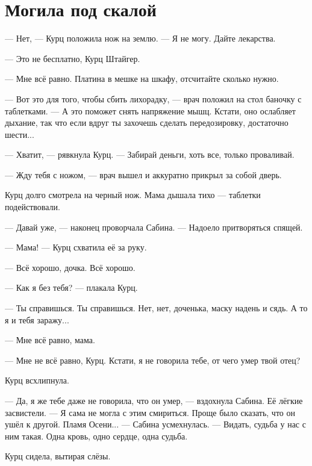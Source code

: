 \documentclass[a4paper,12pt,fleqn]{book}\usepackage{polyglossia}\setdefaultlanguage[babelshorthands=true]{russian}\setotherlanguage{english}\defaultfontfeatures{Ligatures=TeX,Mapping=tex-text}\usepackage{xcolor}\newcommand{\ml}[3]{#2}
\begin{document}
\section{Могила под скалой}

--- Нет, --- Курц положила нож на землю.
--- Я не могу.
Дайте лекарства.

--- Это не бесплатно, Курц Штайгер.

--- Мне всё равно.
Платина в мешке на шкафу, отсчитайте сколько нужно.

--- Вот это для того, чтобы сбить лихорадку, --- врач положил на стол баночку с таблетками.
--- А это поможет снять напряжение мышц.
Кстати, оно ослабляет дыхание, так что если вдруг ты захочешь сделать передозировку, достаточно шести...

--- Хватит, --- рявкнула Курц.
--- Забирай деньги, хоть все, только проваливай.

--- Жду тебя с ножом, --- врач вышел и аккуратно прикрыл за собой дверь.

Курц долго смотрела на черный нож.
Мама дышала тихо --- таблетки подействовали.

--- Давай уже, --- наконец проворчала Сабина.
--- Надоело притворяться спящей.

--- Мама! --- Курц схватила её за руку.

--- Всё хорошо, дочка.
Всё хорошо.

--- Как я без тебя? --- плакала Курц.

--- Ты справишься.
Ты справишься.
Нет, нет, доченька, маску надень и сядь.
А то я и тебя заражу...

\ml{$0$}
{--- Мне всё равно, мама.}
{``I don't care, mama.''}

\ml{$0$}
{--- Мне не всё равно, Курц.}
{``I care, Kurz.}
Кстати, я не говорила тебе, от чего умер твой отец?

Курц всхлипнула.

--- Да, я же тебе даже не говорила, что он умер, --- вздохнула Сабина.
Её лёгкие засвистели.
\ml{$0$}
{--- Я сама не могла с этим смириться.}
{``I couldn't accept that myself.}
\ml{$0$}
{Проще было сказать, что он ушёл к другой.}
{Tell that he left me for another was much much easier.}
\ml{$0$}
{Пламя Осени... --- Сабина усмехнулась.}
{The Flame of the Fall---'' Sabina laughed.}
\ml{$0$}
{--- Видать, судьба у нас с ним такая.}
{``Looks like it's our mutual fate.}
\ml{$0$}
{Одна кровь, одно сердце, одна судьба.}
{One blood, one heart, one fate.''}

Курц сидела, вытирая слёзы.
\end{document}
